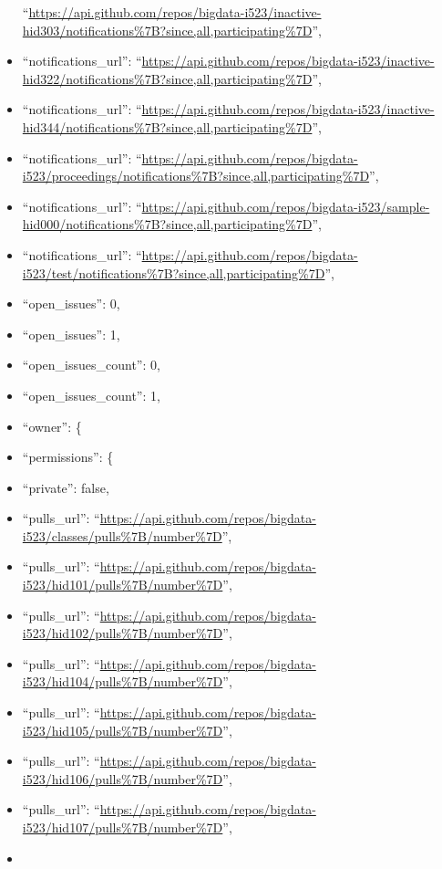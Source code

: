 \begin{itemize}
  ``\url{https://api.github.com/repos/bigdata-i523/inactive-hid303/notifications\%7B?since,all,participating\%7D}'',
\item
  ``notifications\_url'':
  ``\url{https://api.github.com/repos/bigdata-i523/inactive-hid322/notifications\%7B?since,all,participating\%7D}'',
\item
  ``notifications\_url'':
  ``\url{https://api.github.com/repos/bigdata-i523/inactive-hid344/notifications\%7B?since,all,participating\%7D}'',
\item
  ``notifications\_url'':
  ``\url{https://api.github.com/repos/bigdata-i523/proceedings/notifications\%7B?since,all,participating\%7D}'',
\item
  ``notifications\_url'':
  ``\url{https://api.github.com/repos/bigdata-i523/sample-hid000/notifications\%7B?since,all,participating\%7D}'',
\item
  ``notifications\_url'':
  ``\url{https://api.github.com/repos/bigdata-i523/test/notifications\%7B?since,all,participating\%7D}'',
\item
  ``open\_issues'': 0,
\item
  ``open\_issues'': 1,
\item
  ``open\_issues\_count'': 0,
\item
  ``open\_issues\_count'': 1,
\item
  ``owner'': \{
\item
  ``permissions'': \{
\item
  ``private'': false,
\item
  ``pulls\_url'':
  ``\url{https://api.github.com/repos/bigdata-i523/classes/pulls\%7B/number\%7D}'',
\item
  ``pulls\_url'':
  ``\url{https://api.github.com/repos/bigdata-i523/hid101/pulls\%7B/number\%7D}'',
\item
  ``pulls\_url'':
  ``\url{https://api.github.com/repos/bigdata-i523/hid102/pulls\%7B/number\%7D}'',
\item
  ``pulls\_url'':
  ``\url{https://api.github.com/repos/bigdata-i523/hid104/pulls\%7B/number\%7D}'',
\item
  ``pulls\_url'':
  ``\url{https://api.github.com/repos/bigdata-i523/hid105/pulls\%7B/number\%7D}'',
\item
  ``pulls\_url'':
  ``\url{https://api.github.com/repos/bigdata-i523/hid106/pulls\%7B/number\%7D}'',
\item
  ``pulls\_url'':
  ``\url{https://api.github.com/repos/bigdata-i523/hid107/pulls\%7B/number\%7D}'',
\item

\end{itemize}
